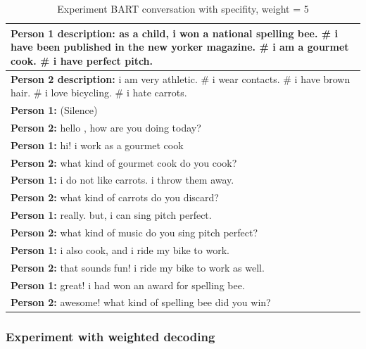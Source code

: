 \begin{table}[ht]
\centering
 \begin{tabular}{|p{14cm}|} 
 \hline\hline
 \textbf{Person 1 description:} as a child, i won a national spelling bee. \# i have been published in the new yorker magazine. \# i am a gourmet cook. \# i have perfect pitch. \\
 \hline
 \textbf{Person 2 description:} i am very athletic. \# i wear contacts. \# i have brown hair. \# i love bicycling. \# i hate carrots. \\
 \hline\hline
 \textbf{Person 1:} (Silence) \\
 \textbf{Person 2:} hello , how are you doing today? \\ 
 \textbf{Person 1:} hi! i work as a gourmet cook \\
 \textbf{Person 2:} what kind of gourmet cook do you cook?\\
 \textbf{Person 1:} i do not like carrots. i throw them away. \\
 \textbf{Person 2:} what kind of carrots do you discard? \\
 \textbf{Person 1:} really. but, i can sing pitch perfect. \\
 \textbf{Person 2:} what kind of music do you sing pitch perfect? \\
 \textbf{Person 1:} i also cook, and i ride my bike to work. \\
 \textbf{Person 2:} that sounds fun! i ride my bike to work as well. \\
 \textbf{Person 1:} great! i had won an award for spelling bee. \\
 \textbf{Person 2:} awesome! what kind of spelling bee did you win? \\
 \hline\hline
 \end{tabular}
 \caption{Experiment BART conversation with specifity, weight = 5}
\label{tab:bart_conversation_idf5}
\end{table}

\subsubsection{Experiment with weighted decoding}

